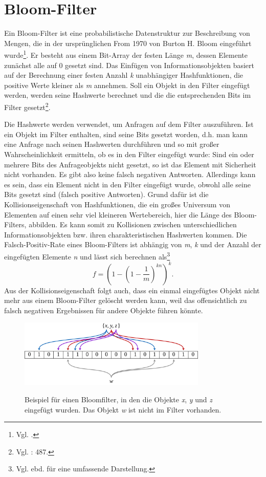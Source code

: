 \section{Bloom-Filter}\label{sec:bloom}
Ein Bloom-Filter ist eine probabilistische Datenstruktur zur Beschreibung von Mengen, die in der ursprünglichen From 1970 von Burton H. Bloom eingeführt wurde\footnote{Vgl. \cite{Bloom1970}.}. Er besteht aus einem Bit-Array der festen Länge \textit{m}, dessen Elemente zunächst alle auf 0 gesetzt sind. Das Einfügen von Informationsobjekten basiert auf der Berechnung einer festen Anzahl \textit{k} unabhängiger Hashfunktionen, die positive Werte kleiner als \textit{m} annehmen. Soll ein Objekt in den Filter eingefügt werden, werden seine Hashwerte berechnet und die die entsprechenden Bits im Filter gesetzt\footnote{Vgl. \cite{Broder2004}: 487.}. 

Die Hashwerte werden verwendet, um Anfragen auf dem Filter auszuführen. Ist ein Objekt im Filter enthalten, sind seine Bits gesetzt worden, d.h. man kann eine Anfrage nach seinen Hashwerten durchführen und so mit großer Wahrscheinlichkeit ermitteln, ob es in den Filter eingefügt wurde: Sind ein oder mehrere Bits des Anfrageobjekts nicht gesetzt, so ist das Element mit Sicherheit nicht vorhanden. Es gibt also keine falsch negativen Antworten. Allerdings kann es sein, dass ein Element nicht in den Filter eingefügt wurde, obwohl alle seine Bits gesetzt sind (falsch positive Antworten). Grund dafür ist die Kollisionseigenschaft von Hashfunktionen, die ein großes Universum von Elementen auf einen sehr viel kleineren Wertebereich, hier die Länge des Bloom-Filters, abbilden. Es kann somit zu Kollisionen zwischen unterschiedlichen Informationsobjekten bzw. ihren charakteristischen Hashwerten kommen. Die Falsch-Positiv-Rate eines Bloom-Filters ist abhängig von \textit{m}, \textit{k} und der Anzahl der eingefügten Elemente \textit{n} und lässt sich berechnen als\footnote{Vgl. ebd. für eine umfassende Darstellung.}
\[f = \left(1 - \left(1-\frac{1}{m}\right)^{kn}\right)^k.\]
Aus der Kollisionseigenschaft folgt auch, dass ein einmal eingefügtes Objekt nicht mehr aus einem Bloom-Filter gelöscht werden kann, weil das offensichtlich zu falsch negativen Ergebnissen für andere Objekte führen könnte. 
\begin{figure}[hpbt]
  \centering
  \includegraphics[width=0.8\textwidth]{pictures/1280px-Bloom_filter.png}\\
  \caption[Bloomfilter-Beispiel, Bildnachweis: \url{https://commons.wikimedia.org/wiki/File:Bloom_filter.svg}.]{Beispiel für einen Bloomfilter, in den die Objekte \textit{x}, \textit{y} und \textit{z} eingefügt wurden. Das Objekt \textit{w} ist nicht im Filter vorhanden.}\label{fig:pic0}
\end{figure}
